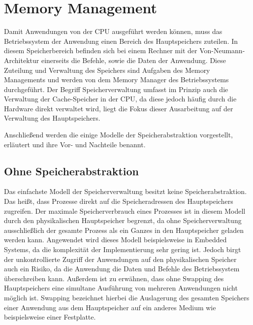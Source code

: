 \section{Memory Management}
\label{sec:MemoryManagement}
Damit Anwendungen von der CPU ausgeführt werden können, muss das Betriebssystem der Anwendung einen Bereich des Hauptspeichers zuteilen. In diesem Speicherbereich befinden sich bei einem Rechner mit der Von-Neumann-Architektur einerseits die Befehle, sowie die Daten der Anwendung. Diese Zuteilung und Verwaltung des Speichers sind Aufgaben des Memory Managements und werden von dem Memory Manager des Betriebssystems durchgeführt. Der Begriff Speicherverwaltung umfasst im Prinzip auch die Verwaltung der Cache-Speicher in der CPU, da diese jedoch häufig durch die Hardware direkt verwaltet wird, liegt die Fokus dieser Ausarbeitung auf der Verwaltung des Hauptspeichers.

Anschließend werden die einige Modelle der Speicherabstraktion vorgestellt, erläutert und ihre Vor- und Nachteile benannt.

\subsection{Ohne Speicherabstraktion}
\label{subsec:OhneSpeicherabstraktion}
Das einfachste Modell der Speicherverwaltung besitzt keine Speicherabstraktion. Das heißt, dass Prozesse direkt auf die Speicheradressen des Hauptspeichers zugreifen. Der maximale Speicherverbrauch eines Prozesses ist in diesem Modell durch den physikalischen Hauptspeicher begrenzt, da ohne Speicherverwaltung ausschließlich der gesamte Prozess als ein Ganzes in den Hauptspeicher geladen werden kann. Angewendet wird dieses Modell beispielsweise in Embedded Systems, da die komplexität der Implementierung sehr gering ist. Jedoch birgt der unkontrollierte Zugriff der Anwendungen auf den physikalischen Speicher auch ein Risiko, da die Anwendung die Daten und Befehle des Betriebssystem überschreiben kann. Außerdem ist zu erwähnen, dass ohne Swapping des Hauptspeichers eine simultane  Ausführung von mehreren Anwendungen nicht möglich ist. Swapping bezeichnet hierbei die Auslagerung des gesamten Speichers einer Anwendung aus dem Hauptspeicher auf ein anderes Medium wie beispielsweise einer Festplatte.


